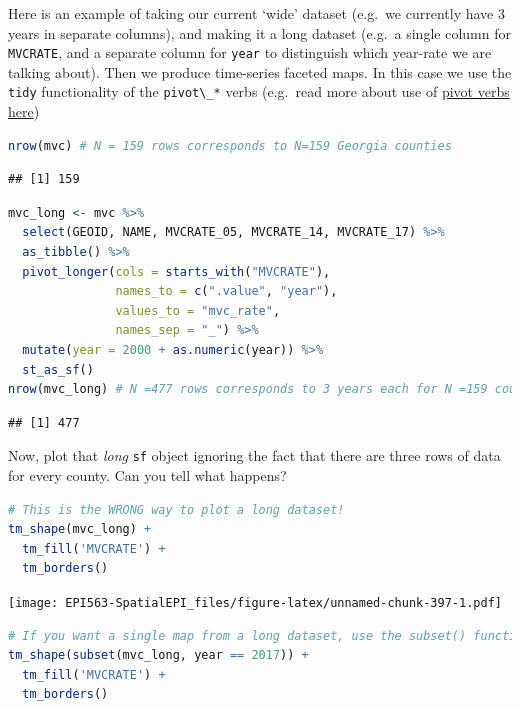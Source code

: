 \documentclass[
]{book}
\newcommand{\passthrough}[1]{#1}
\begin{document}
Here is an example of taking our current `wide' dataset (e.g.~we currently have 3 years in separate columns), and making it a long dataset (e.g.~a single column for \passthrough{\lstinline!MVCRATE!}, and a separate column for \passthrough{\lstinline!year!} to distinguish which year-rate we are talking about). Then we produce time-series faceted maps. In this case we use the \passthrough{\lstinline!tidy!} functionality of the \passthrough{\lstinline!pivot\_*!} verbs (e.g.~read more about use of \protect\hyperlink{pivot_}{pivot verbs here})

\begin{lstlisting}[language=R]
nrow(mvc) # N = 159 rows corresponds to N=159 Georgia counties
\end{lstlisting}

\begin{lstlisting}
## [1] 159
\end{lstlisting}

\begin{lstlisting}[language=R]
mvc_long <- mvc %>%
  select(GEOID, NAME, MVCRATE_05, MVCRATE_14, MVCRATE_17) %>%
  as_tibble() %>%
  pivot_longer(cols = starts_with("MVCRATE"),
               names_to = c(".value", "year"),
               values_to = "mvc_rate",
               names_sep = "_") %>%
  mutate(year = 2000 + as.numeric(year)) %>%
  st_as_sf()
nrow(mvc_long) # N =477 rows corresponds to 3 years each for N =159 counties  
\end{lstlisting}

\begin{lstlisting}
## [1] 477
\end{lstlisting}

Now, plot that \emph{long} \passthrough{\lstinline!sf!} object ignoring the fact that there are three rows of data for every county. Can you tell what happens?

\begin{lstlisting}[language=R]
# This is the WRONG way to plot a long dataset!
tm_shape(mvc_long) +
  tm_fill('MVCRATE') +
  tm_borders()
\end{lstlisting}

\texttt{[image: EPI563-SpatialEPI\_files/figure-latex/unnamed-chunk-397-1.pdf]}

\begin{lstlisting}[language=R]
# If you want a single map from a long dataset, use the subset() function ...
tm_shape(subset(mvc_long, year == 2017)) +
  tm_fill('MVCRATE') +
  tm_borders()
\end{lstlisting}
\end{document}
